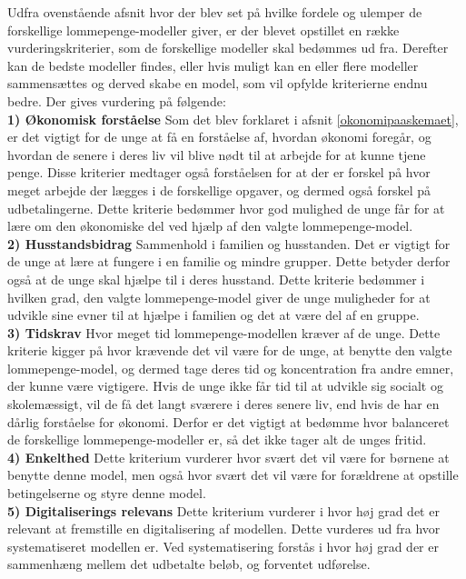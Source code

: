 Udfra ovenstående afsnit hvor der blev set på hvilke fordele og ulemper de forskellige lommepenge-modeller giver, er der blevet opstillet en række vurderingskriterier, som de forskellige modeller skal bedømmes ud fra. Derefter kan de bedste modeller findes, eller hvis muligt kan en eller flere modeller sammensættes og derved skabe en model, som vil opfylde kriterierne endnu bedre. Der gives vurdering på følgende:\\

\noindent\textbf{1) Økonomisk forståelse}
Som det blev forklaret i afsnit \ref{okonomipaaskemaet}, er det vigtigt for de unge at få en forståelse af, hvordan økonomi foregår, og hvordan de senere i deres liv vil blive nødt til at arbejde for at kunne tjene penge. 
Disse kriterier medtager også forståelsen for at der er forskel på hvor meget arbejde der lægges i de forskellige opgaver, og dermed også forskel på udbetalingerne.
Dette kriterie bedømmer hvor god mulighed de unge får for at lære om den økonomiske del ved hjælp af den valgte lommepenge-model.\\

\noindent\textbf{2) Husstandsbidrag}
Sammenhold i familien og husstanden. 
Det er vigtigt for de unge at lære at fungere i en familie og mindre grupper. Dette betyder derfor også at de unge skal hjælpe til i deres husstand.
Dette kriterie bedømmer i hvilken grad, den valgte lommepenge-model giver de unge muligheder for at udvikle sine evner til at hjælpe i familien og det at være del af en gruppe.\\

\noindent\textbf{3) Tidskrav}
Hvor meget tid lommepenge-modellen kræver af de unge.
Dette kriterie kigger på hvor krævende det vil være for de unge, at benytte den valgte lommepenge-model, og dermed tage deres tid og koncentration fra andre emner, der kunne være vigtigere. Hvis de unge ikke får tid til at udvikle sig socialt og skolemæssigt, vil de få det langt sværere i deres senere liv, end hvis de har en dårlig forståelse for økonomi.
Derfor er det vigtigt at bedømme hvor balanceret de forskellige lommepenge-modeller er, så det ikke tager alt de unges fritid.\\

\noindent\textbf{4) Enkelthed}
Dette kriterium vurderer hvor svært det vil være for børnene at benytte denne model, men også hvor svært det vil være for forældrene at opstille betingelserne og styre denne model.\\

\noindent\textbf{5) Digitaliserings relevans}
Dette kriterium vurderer i hvor høj grad det er relevant at fremstille en digitalisering af modellen. Dette vurderes ud fra hvor systematiseret modellen er. Ved systematisering forstås i hvor høj grad der er sammenhæng mellem det udbetalte beløb, og forventet udførelse. \\

